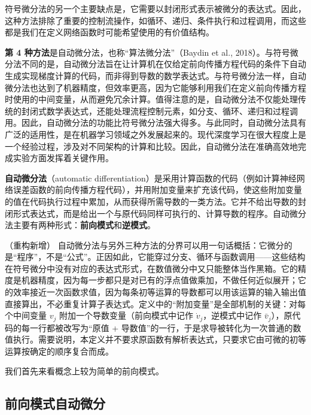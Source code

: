 \documentclass[../../main.tex]{subfiles}
\begin{document}
符号微分法的另一个主要缺点是，它需要以封闭形式表示被微分的表达式。因此，这种方法排除了重要的控制流操作，如循环、递归、条件执行和过程调用，而这些都是我们在定义网络函数时可能希望使用的有价值结构。

\textbf{第 4 种方法}是自动微分法，也称“算法微分法”（Baydin et al., 2018）。与符号微分法不同的是，自动微分法旨在让计算机在仅给定前向传播方程代码的条件下自动生成实现梯度计算的代码，而非得到导数的数学表达式。与符号微分法一样，自动微分法也达到了机器精度，但效率更高，因为它能够利用我们在定义前向传播方程时使用的中间变量，从而避免冗余计算。值得注意的是，自动微分法不仅能处理传统的封闭式数学表达式，还能处理流程控制元素，如分支、循环、递归和过程调用。因此，自动微分法的功能比符号微分法强大得多。与此同时，自动微分法具有广泛的适用性，是在机器学习领域之外发展起来的。现代深度学习在很大程度上是一个经验过程，涉及对不同架构的计算和比较。因此，自动微分法在准确高效地完成实验方面发挥着关键作用。

\begin{definition}[自动微分法]\label{definition:ch08-自动微分法}
\textbf{自动微分法}（automatic differentiation）是采用计算函数的代码（例如计算神经网络误差函数的前向传播方程代码），并用附加变量来扩充该代码，使这些附加变量的值在代码执行过程中累加，从而获得所需导数的一类方法。它并不给出导数的封闭形式表达式，而是给出一个与原代码同样可执行的、计算导数的程序。自动微分法主要有两种形式：\textbf{前向模式}和\textbf{逆模式}。
\end{definition}

\begin{remark}（重构新增）
自动微分法与另外三种方法的分界可以用一句话概括：它微分的是“程序”，不是“公式”。正因如此，它能穿过分支、循环与函数调用——这些结构在符号微分中没有对应的表达式形式，在数值微分中又只能整体当作黑箱。它的精度是机器精度，因为每一步都只是对已有的浮点值做乘加，不做任何近似展开；它的效率接近一次函数求值，因为每条初等运算的导数都可以用该运算的输入输出值直接算出，不必重复计算子表达式。定义中的“附加变量”是全部机制的关键：对每个中间变量 $v_j$ 附加一个导数变量（前向模式中记作 $\dot{v}_j$，逆模式中记作 $\bar{v}_j$），原代码的每一行都被改写为“原值 + 导数值”的一行，于是求导被转化为一次普通的数值执行。需要说明，本定义并不要求原函数有解析表达式，只要求它由可微的初等运算按确定的顺序复合而成。
\end{remark}

我们首先来看概念上较为简单的前向模式。

\subsection{前向模式自动微分}\label{subsection:ch08-前向模式}
\end{document}
